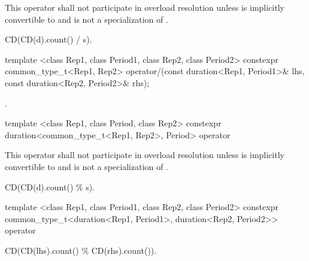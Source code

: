 \begin{itemdescr}
\pnum
\remarks This operator shall not participate in overload
resolution unless  is implicitly convertible to 
and  is not a specialization of .

\pnum
\returns CD(CD(d).count() / s).
\end{itemdescr}

%
%
\begin{itemdecl}
template <class Rep1, class Period1, class Rep2, class Period2>
  constexpr common_type_t<Rep1, Rep2>
  operator/(const duration<Rep1, Period1>& lhs, const duration<Rep2, Period2>& rhs);
\end{itemdecl}

\begin{itemdescr}
\pnum
\returns {}.
\end{itemdescr}

%
%
\begin{itemdecl}
template <class Rep1, class Period, class Rep2>
  constexpr duration<common_type_t<Rep1, Rep2>, Period>
  operator%
\end{itemdecl}

\begin{itemdescr}
\pnum
\remarks This operator shall not participate in overload
resolution unless  is implicitly convertible to  and
 is not a specialization of .

\pnum
\returns CD(CD(d).count() \% s).
\end{itemdescr}

%
%
\begin{itemdecl}
template <class Rep1, class Period1, class Rep2, class Period2>
  constexpr common_type_t<duration<Rep1, Period1>, duration<Rep2, Period2>>
  operator%
\end{itemdecl}

\begin{itemdescr}
\pnum
\returns CD(CD(lhs).count() \% CD(rhs).count()).
\end{itemdescr}


